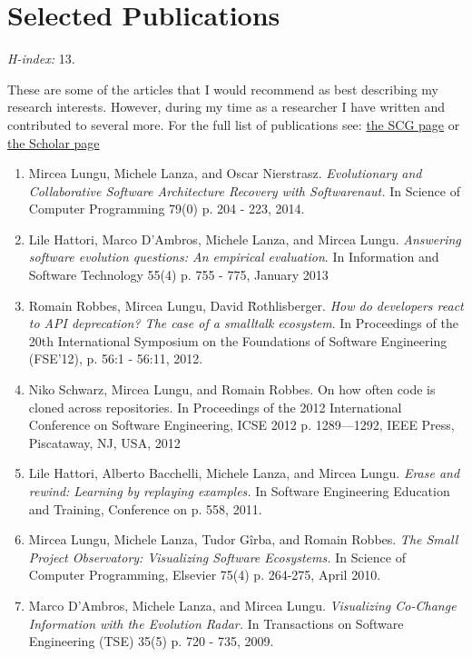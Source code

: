 \section{Selected Publications}
\emph{H-index:} 13.

These are some of the articles that I would recommend as best describing my research interests. However, during my time as a researcher I have written and contributed to several more. For the full list of publications see: \href{http://scg.unibe.ch/staff/mircea/pubs}{the SCG page} or \href{http://scholar.google.ch/citations?user=7zx6Cg0AAAAJ}{the Scholar page}

\begin{enumerate}
\item Mircea Lungu, Michele Lanza, and Oscar Nierstrasz. \emph{Evolutionary and Collaborative Software Architecture Recovery with Softwarenaut.}  In Science of Computer Programming 79(0) p. 204 - 223, 2014.

\item Lile Hattori, Marco D'Ambros, Michele Lanza, and Mircea Lungu. \emph{Answering software evolution questions: An empirical evaluation}. In Information and Software Technology 55(4) p. 755 - 775, January 2013

\item Romain Robbes, Mircea Lungu, David R{\"}othlisberger. \emph{How do developers react to API deprecation? The case of a smalltalk ecosystem}. In Proceedings of the 20th International Symposium on the	 Foundations of Software Engineering (FSE'12), p. 56:1 - 56:11, 2012.

\item Niko Schwarz, Mircea Lungu, and Romain Robbes. On how often code is cloned across repositories. In Proceedings of the 2012 International Conference on Software Engineering, ICSE 2012 p. 1289—1292, IEEE Press, Piscataway, NJ, USA, 2012

\item Lile Hattori, Alberto Bacchelli, Michele Lanza, and Mircea Lungu. \emph{Erase and rewind: Learning by replaying examples.} In Software Engineering Education and Training, Conference on p. 558, 2011.

\item Mircea Lungu, Michele Lanza, Tudor G\^irba, and Romain Robbes. \emph{The Small Project Observatory: Visualizing Software Ecosystems.} In Science of Computer Programming, Elsevier 75(4) p. 264-275, April 2010.

\item Marco D'Ambros, Michele Lanza, and Mircea Lungu. \emph{Visualizing Co-Change Information with the Evolution Radar.} In Transactions on Software Engineering (TSE) 35(5) p. 720 - 735, 2009.
\end{enumerate}